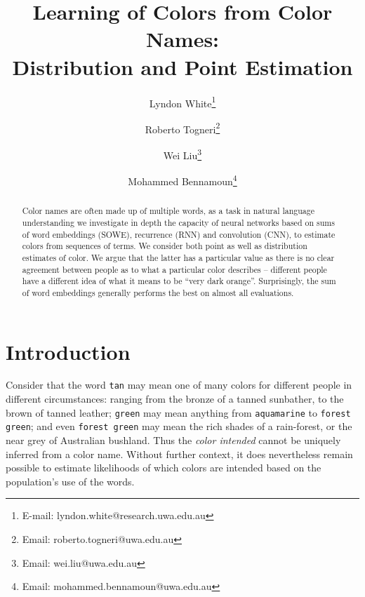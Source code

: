 \documentclass[]{clv3}
\begin{document}
\title{Learning of Colors from Color Names: \\ Distribution and Point Estimation}
\author{Lyndon White\thanks{E-mail: {lyndon.white@research.uwa.edu.au}}}

\author{Roberto Togneri\thanks{Email: {roberto.togneri@uwa.edu.au}}}
\author{Wei Liu\thanks{Email: {wei.liu@uwa.edu.au}}}
\author{Mohammed Bennamoun\thanks{Email: {mohammed.bennamoun@uwa.edu.au}}}



\maketitle
%
\begin{abstract}
Color names are often made up of multiple words,
as a task in natural language understanding we investigate in depth the capacity of neural networks based on sums of word embeddings (SOWE), recurrence (RNN) and convolution (CNN), to estimate colors from sequences of terms.
We consider both point as well as distribution estimates of color.
We argue that the latter has a particular value as there is no clear agreement between people as to what a particular color describes -- different people have a different idea of what it means to be ``very dark orange''.
Surprisingly, the sum of word embeddings generally performs the best on almost all evaluations.
\end{abstract}

\section{Introduction}\label{sec:intro}

Consider that the word \texttt{tan} may mean one of many colors for different people in different circumstances: ranging from the bronze of a tanned sunbather, to the brown of tanned leather;
\texttt{green} may mean anything from \texttt{aquamarine} to \texttt{forest green};
and even \texttt{forest green} may mean the rich shades of a rain-forest, or the near grey of Australian bushland.
Thus the \emph{color intended} cannot be uniquely inferred from a color name. Without further context, it does nevertheless remain possible to estimate likelihoods of which colors are intended based on the population's use of the words.
\end{document}
